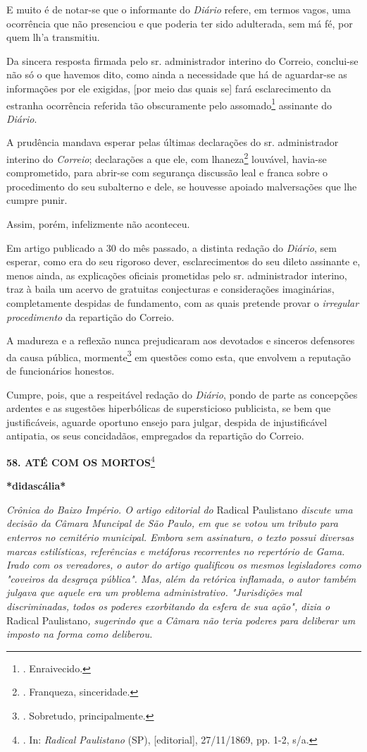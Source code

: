 E muito é de notar-se que o informante do \emph{Diário} refere, em
termos vagos, uma ocorrência que não presenciou e que poderia ter sido
adulterada, sem má fé, por quem lh'a transmitiu.

Da sincera resposta firmada pelo sr. administrador interino do Correio,
conclui-se não só o que havemos dito, como ainda a necessidade que há de
aguardar-se as informações por ele exigidas, {[}por meio das quais se{]}
fará esclarecimento da estranha ocorrência referida tão obscuramente
pelo assomado\footnote{. Enraivecido.} assinante do \emph{Diário}.

A prudência mandava esperar pelas últimas declarações do sr.
administrador interino do \emph{Correio}; declarações a que ele, com
lhaneza\footnote{. Franqueza, sinceridade.} louvável, havia-se
comprometido, para abrir-se com segurança discussão leal e franca sobre
o procedimento do seu subalterno e dele, se houvesse apoiado
malversações que lhe cumpre punir.

Assim, porém, infelizmente não aconteceu.

Em artigo publicado a 30 do mês passado, a distinta redação do
\emph{Diário}, sem esperar, como era do seu rigoroso dever,
esclarecimentos do seu dileto assinante e, menos ainda, as explicações
oficiais prometidas pelo sr. administrador interino, traz à baila um
acervo de gratuitas conjecturas e considerações imaginárias,
completamente despidas de fundamento, com as quais pretende provar o
\emph{irregular procedimento} da repartição do Correio.

A madureza e a reflexão nunca prejudicaram aos devotados e sinceros
defensores da causa pública, mormente\footnote{. Sobretudo,
  principalmente.} em questões como esta, que envolvem a reputação de
funcionários honestos.

Cumpre, pois, que a respeitável redação do \emph{Diário}, pondo de parte
as concepções ardentes e as sugestões hiperbólicas de supersticioso
publicista, se bem que justificáveis, aguarde oportuno ensejo para
julgar, despida de injustificável antipatia, os seus concidadãos,
empregados da repartição do Correio.

\textbf{58. ATÉ COM OS MORTOS}\footnote{. In: \emph{Radical Paulistano}
  (SP), {[}editorial{]}, 27/11/1869, pp. 1-2, s/a.}

\textbf{*didascália*}

\emph{Crônica do Baixo Império. O artigo editorial do} Radical
Paulistano \emph{discute uma decisão da Câmara Muncipal de São Paulo, em
que se votou um tributo para enterros no cemitério municipal. Embora sem
assinatura, o texto possui diversas marcas estilísticas, referências e
metáforas recorrentes no repertório de Gama. Irado com os vereadores, o
autor do artigo qualificou os mesmos legisladores como "coveiros da
desgraça pública". Mas, além da retórica inflamada, o autor também
julgava que aquele era um problema administrativo. "Jurisdições mal
discriminadas, todos os poderes exorbitando da esfera de sua ação",
dizia o} Radical Paulistano\emph{, sugerindo que a Câmara não teria
poderes para deliberar um imposto na forma como deliberou.}

